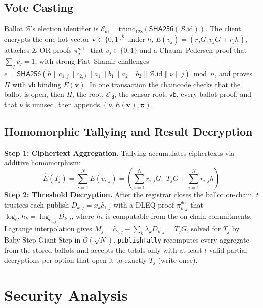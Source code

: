 \documentclass[10pt,letterpaper,journal]{IEEEtran}
\begin{document}
\subsection{Vote Casting}
Ballot $\mathcal{B}$'s election identifier is $\mathcal{E}_{\mathsf{id}} = \text{trunc}_{128}(\mathsf{SHA256}(\mathcal{B}.\text{id}))$.
The client encrypts the one-hot vector $\mathbf{v} \in \{0,1\}^k$ under $h$, $E(v_j) = (r_j G, v_j G + r_j h)$, attaches $\Sigma$-OR proofs $\pi_j^{\mathsf{val}}$~\cite{ChaumPedersen1992} that $v_j \in \{0,1\}$ and a Chaum--Pedersen proof that $\sum_j v_j = 1$, with strong Fiat--Shamir challenges $e = \mathsf{SHA256}(h \parallel c_{1,j} \parallel c_{2,j} \parallel a_1 \parallel b_1 \parallel a_2 \parallel b_2 \parallel \mathcal{B}.\text{id} \parallel \nu \parallel j) \bmod n$, and proves $\Pi$ with $\mathsf{vb}$ binding $E(\mathbf{v})$. In one transaction the chaincode checks that the ballot is open, then $\Pi$, the root, $\mathcal{E}_{\mathsf{id}}$, the sensor root, $\mathsf{vb}$, every ballot proof, and that $\nu$ is unused, then appends $(\nu, E(\mathbf{v}), \boldsymbol{\pi})$.

\subsection{Homomorphic Tallying and Result Decryption}
\textbf{Step 1: Ciphertext Aggregation.} Tallying accumulates ciphertexts via additive homomorphism:
\begin{equation}
  \hat{E}(T_j) = \sum_{i=1}^{N} E(v_{i,j}) = \left( \sum_{i=1}^{N} r_{i,j} G, \; T_j G + \sum_{i=1}^{N} r_{i,j} h \right)
\end{equation}
\textbf{Step 2: Threshold Decryption.} After the registrar closes the ballot on-chain, $t$ trustees each publish $D_{k,j} = x_k \hat{c}_{1,j}$ with a DLEQ proof $\pi_{k,j}^{\mathsf{dec}}$ that $\log_G h_k = \log_{\hat{c}_{1,j}} D_{k,j}$, where $h_k$ is computable from the on-chain commitments. Lagrange interpolation gives $M_j = \hat{c}_{2,j} - \sum_k \lambda_k D_{k,j} = T_j G$, solved for $T_j$ by Baby-Step Giant-Step in $\mathcal{O}(\sqrt{N})$. \texttt{publishTally} recomputes every aggregate from the stored ballots and accepts the totals only with at least $t$ valid partial decryptions per option that open it to exactly $T_j$ (write-once).

\section{Security Analysis}
\label{sec:security}
\end{document}

